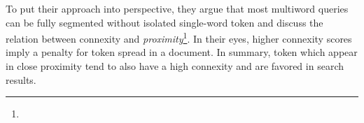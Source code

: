 To put their approach into perspective, they 	argue that most multiword queries can be fully segmented without isolated single-word token and discuss the relation between connexity and \textit{proximity}\footnote{}. In their eyes, higher connexity scores imply a penalty for token spread in a document. In summary, token which appear in close proximity tend to also have a high connexity and are favored in search results.